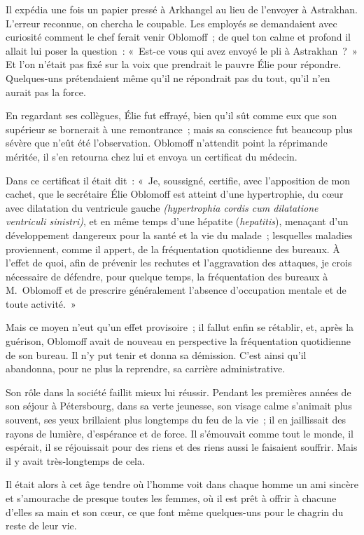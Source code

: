 \documentclass[french,twoside]{book} %
\begin{document}
Il expédia une fois un papier pressé à Arkhangel au lieu de l’envoyer à Astrakhan. L’erreur reconnue, on chercha le coupable. Les employés se demandaient avec curiosité comment le chef ferait venir Oblomoff ; de quel ton calme et profond il allait lui poser la question : « Est-ce vous qui avez envoyé le pli à Astrakhan ? » Et l’on n’était pas fixé sur la voix que prendrait le pauvre Élie pour répondre. Quelques-uns prétendaient même qu’il ne répondrait pas du tout, qu’il n’en aurait pas la force.\par
En regardant ses collègues, Élie fut effrayé, bien qu’il sût comme eux que son supérieur se bornerait à une remontrance ; mais sa conscience fut beaucoup plus sévère que n’eût été l’observation. Oblomoff n’attendit point la réprimande méritée, il s’en retourna chez lui et envoya un certificat du médecin.\par
Dans ce certificat il était dit : « Je, soussigné, certifie, avec l’apposition de mon cachet, que le secrétaire Élie Oblomoff est atteint d’une hypertrophie, du cœur avec dilatation du ventricule gauche \emph{(hypertrophia cordis cum dilatatione ventriculi sinistri)}, et en même temps d’une hépatite (\emph{hepatitis}), menaçant d’un développement dangereux pour la santé et la vie du malade ; lesquelles maladies proviennent, comme il appert, de la fréquentation quotidienne des bureaux. À l’effet de quoi, afin de prévenir les rechutes et l’aggravation des attaques, je crois nécessaire de défendre, pour quelque temps, la fréquentation des bureaux à M. Oblomoff et de prescrire généralement l’absence d’occupation mentale et de toute activité. »\par
Mais ce moyen n’eut qu’un effet provisoire ; il fallut enfin se rétablir, et, après la guérison, Oblomoff avait de nouveau en perspective la fréquentation quotidienne de son bureau. Il n’y put tenir et donna sa démission. C’est ainsi qu’il abandonna, pour ne plus la reprendre, sa carrière administrative.\par
Son rôle dans la société faillit mieux lui réussir. Pendant les premières années de son séjour à Pétersbourg, dans sa verte jeunesse, son visage calme s’animait plus souvent, ses yeux brillaient plus longtemps du feu de la vie ; il en jaillissait des rayons de lumière, d’espérance et de force. Il s’émouvait comme tout le monde, il espérait, il se réjouissait pour des riens et des riens aussi le faisaient souffrir. Mais il y avait très-longtemps de cela.\par
Il était alors à cet âge tendre où l’homme voit dans chaque homme un ami sincère et s’amourache de presque toutes les femmes, où il est prêt à offrir à chacune d’elles sa main et son cœur, ce que font même quelques-uns pour le chagrin du reste de leur vie.\par
\end{document}

